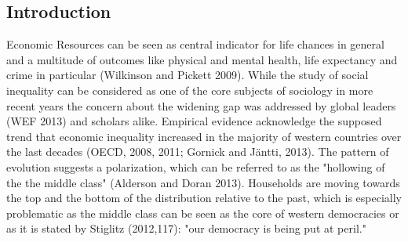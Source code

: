 \documentclass[twoside]{article}\usepackage[]{graphicx}\usepackage[]{color}
\begin{document}
\begin{multicols}{2} %




\section{Introduction}





Economic Resources can be seen as central indicator for life chances in general and a multitude of outcomes like physical and mental health, life expectancy and crime in particular (Wilkinson and Pickett 2009). While the study of social inequality can be considered as one of the core subjects of sociology in more recent years the concern about the widening gap was addressed by global leaders (WEF 2013) and scholars alike. Empirical evidence acknowledge the supposed trend that economic inequality increased in the majority of western countries over the last decades (OECD, 2008, 2011; Gornick and Jäntti, 2013). The pattern of evolution suggests a polarization, which can be referred to as the "hollowing of the the middle class" (Alderson and Doran 2013). Households are moving towards the top and the bottom of the distribution relative to the past, which is especially problematic as the middle class can be seen as the core of western democracies or as it is stated by Stiglitz (2012,117): "our democracy is being put at peril."
\\





\end{multicols}
\end{document}
